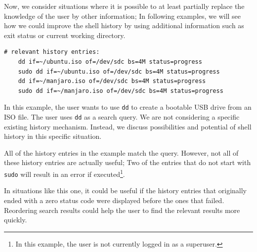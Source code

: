 Now, we consider situations where it is possible to at least partially replace the knowledge of the user by other information; In following examples, we will see how we could improve the shell history by using additional information such as exit status or current working directory.

    
    
\begin{verbatim}
# relevant history entries:        
    dd if=~/ubuntu.iso of=/dev/sdc bs=4M status=progress
    sudo dd if=~/ubuntu.iso of=/dev/sdc bs=4M status=progress
    dd if=~/manjaro.iso of=/dev/sdc bs=4M status=progress
    sudo dd if=~/manjaro.iso of=/dev/sdc bs=4M status=progress
\end{verbatim}

In this example, the user wants to use \verb|dd| to create a bootable USB drive from an ISO file. The user uses \verb|dd| as a search query. We are not considering a specific existing history mechanism. Instead, we discuss possibilities and potential of shell history in this specific situation.

All of the history entries in the example match the query. However, not all of these history entries are actually useful; Two of the entries that do not start with \verb|sudo| will result in an error if executed\footnote{In this example, the user is not currently logged in as a superuser.}. 

In situations like this one, it could be useful if the history entries that originally ended with a zero status code were displayed before the ones that failed. Reordering search results could help the user to find the relevant results more quickly. 

% 
%
%


